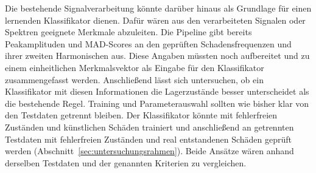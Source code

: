 Die bestehende Signalverarbeitung könnte darüber hinaus als Grundlage
für einen lernenden Klassifikator dienen. Dafür wären aus den verarbeiteten
Signalen oder Spektren geeignete Merkmale abzuleiten. Die Pipeline gibt
bereits Peakamplituden und MAD-Scores an den geprüften Schadensfrequenzen
und ihrer zweiten Harmonischen aus. Diese Angaben müssten noch aufbereitet
und zu einem einheitlichen Merkmalsvektor als Eingabe für den
Klassifikator zusammengefasst werden.
Anschließend lässt sich untersuchen, ob ein Klassifikator mit diesen
Informationen die Lagerzustände besser unterscheidet als die bestehende
Regel.
Training und Parameterauswahl sollten wie bisher klar von den Testdaten
getrennt bleiben. Der Klassifikator könnte mit fehlerfreien Zuständen und
künstlichen Schäden trainiert und anschließend an getrennten Testdaten
mit fehlerfreien Zuständen und real entstandenen Schäden geprüft werden
(Abschnitt~\ref{sec:untersuchungsrahmen}). Beide Ansätze wären anhand
derselben Testdaten und der genannten Kriterien zu vergleichen.

